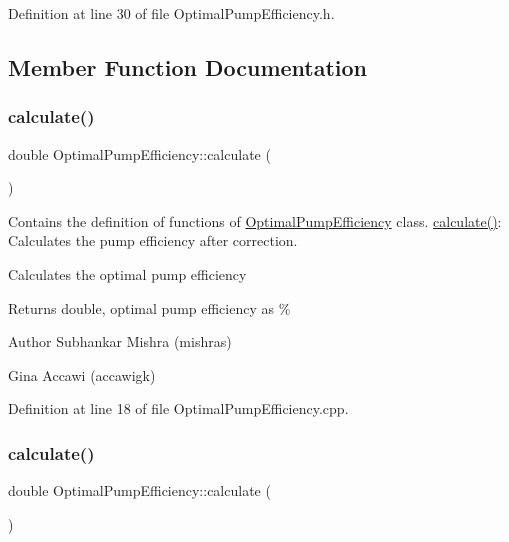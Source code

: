 Definition at line 30 of file Optimal\+Pump\+Efficiency.\+h.



\subsection{Member Function Documentation}
\mbox{\label{class_optimal_pump_efficiency_ac40720d1fcdf40d8b364df37e58e7f4d}} 
\subsubsection{\texorpdfstring{calculate()}{calculate()}\hspace{0.1cm}{\footnotesize\ttfamily [1/3]}}
{\footnotesize\ttfamily double Optimal\+Pump\+Efficiency\+::calculate (\begin{DoxyParamCaption}{ }\end{DoxyParamCaption})}



Contains the definition of functions of \hyperlink{class_optimal_pump_efficiency}{Optimal\+Pump\+Efficiency} class. \hyperlink{class_optimal_pump_efficiency_ac40720d1fcdf40d8b364df37e58e7f4d}{calculate()}\+: Calculates the pump efficiency after correction. 

Calculates the optimal pump efficiency \begin{DoxyReturn}{Returns}
double, optimal pump efficiency as \%
\end{DoxyReturn}
\begin{DoxyAuthor}{Author}
Subhankar Mishra (mishras) 

Gina Accawi (accawigk) 
\end{DoxyAuthor}


Definition at line 18 of file Optimal\+Pump\+Efficiency.\+cpp.

\mbox{\label{class_optimal_pump_efficiency_ac40720d1fcdf40d8b364df37e58e7f4d}} 
\subsubsection{\texorpdfstring{calculate()}{calculate()}\hspace{0.1cm}{\footnotesize\ttfamily [2/3]}}
{\footnotesize\ttfamily double Optimal\+Pump\+Efficiency\+::calculate (\begin{DoxyParamCaption}{ }\end{DoxyParamCaption})}

